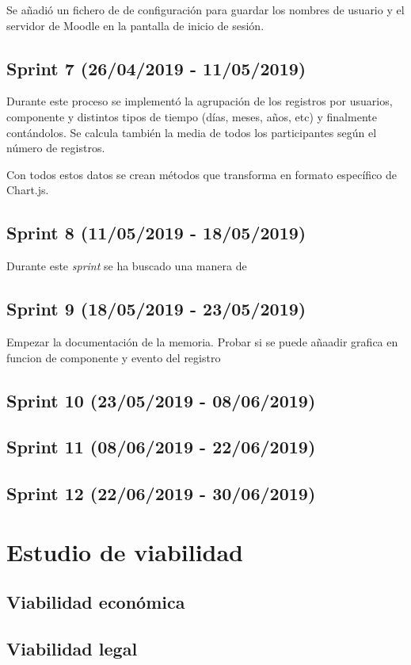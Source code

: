 Se añadió un fichero de de configuración para guardar los nombres de usuario y el servidor de Moodle en la pantalla de inicio de sesión.

\subsection{Sprint 7 (26/04/2019 - 11/05/2019)}

Durante este proceso se implementó la agrupación de los registros por usuarios, componente y distintos tipos de tiempo (días, meses, años, etc) y finalmente contándolos. Se calcula también la media de todos los participantes según el número de registros.

Con todos estos datos se crean métodos que transforma en formato específico de Chart.js.

\subsection{Sprint 8 (11/05/2019 - 18/05/2019)}

Durante este \textit{sprint} se ha buscado una manera de 


\subsection{Sprint 9 (18/05/2019 - 23/05/2019)}
Empezar la documentación de la memoria. Probar si se puede añaadir grafica en funcion de componente y evento del registro

\subsection{Sprint 10 (23/05/2019 - 08/06/2019)}

\subsection{Sprint 11 (08/06/2019 - 22/06/2019)}

\subsection{Sprint 12 (22/06/2019 - 30/06/2019)}


\section{Estudio de viabilidad}

\subsection{Viabilidad económica}



\subsection{Viabilidad legal}


